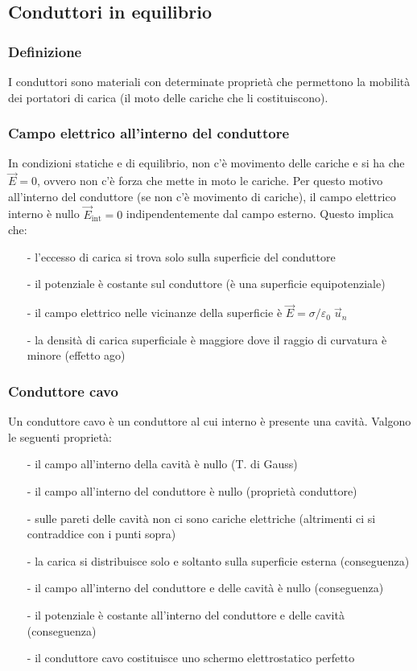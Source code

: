 \documentclass[a4paper]{article}
\newcommand\un{\vec{u}_n}
\begin{document}
\newpage

\subsection{Conduttori in equilibrio}
\subsubsection*{Definizione}
I conduttori sono materiali con determinate proprietà che permettono la mobilità dei portatori di carica (il moto delle cariche
che li costituiscono).

\subsubsection*{Campo elettrico all'interno del conduttore}
In condizioni statiche e di equilibrio, non c'è movimento delle cariche e si ha che \(\vec{E} = 0\), ovvero non c'è forza che
mette in moto le cariche. Per questo motivo all'interno del conduttore (se non c'è movimento di cariche), il campo elettrico
interno è nullo \(\vec{E}_\text{int} = 0\) indipendentemente dal campo esterno. Questo implica che:
\begin{itemize}[topsep=3pt, itemsep=0pt]
	\item[-] l'eccesso di carica si trova solo sulla superficie del conduttore
	\item[-] il potenziale è costante sul conduttore (è una superficie equipotenziale)
	\item[-] il campo elettrico nelle vicinanze della superficie è \(\vec{E} = \sigma / \varepsilon_0 \; \un\)
	\item[-] la densità di carica superficiale è maggiore dove il raggio di curvatura è minore (effetto ago)
\end{itemize}

\subsubsection*{Conduttore cavo}
Un conduttore cavo è un conduttore al cui interno è presente una cavità. Valgono le seguenti proprietà:
\begin{itemize}[topsep=3pt, itemsep=0pt]
	\item[-] il campo all'interno della cavità è nullo (T. di Gauss)
	\item[-] il campo all'interno del conduttore è nullo (proprietà conduttore)
	\item[-] sulle pareti delle cavità non ci sono cariche elettriche (altrimenti ci si contraddice con i punti sopra)
	\item[-] la carica si distribuisce solo e soltanto sulla superficie esterna (conseguenza)
	\item[-] il campo all'interno del conduttore e delle cavità è nullo (conseguenza)
	\item[-] il potenziale è costante all'interno del conduttore e delle cavità (conseguenza)
	\item[-] il conduttore cavo costituisce uno schermo elettrostatico perfetto
\end{itemize}
\end{document}
